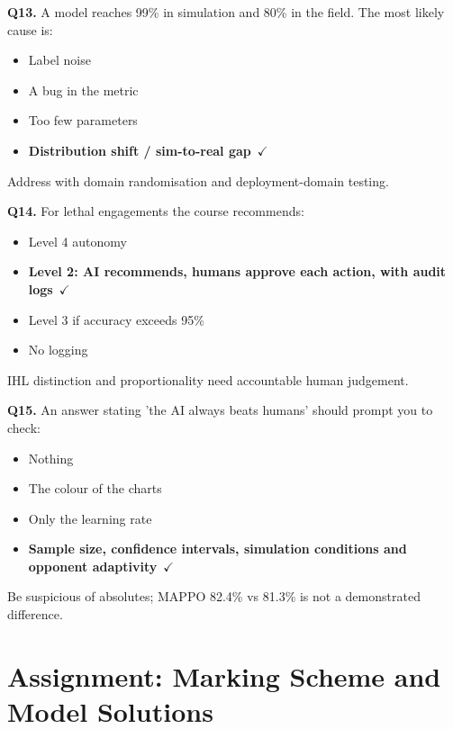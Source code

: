 \documentclass[11pt]{article}
\begin{document}
{\noindent\textbf{Q13.} A model reaches 99\% in simulation and 80\% in the field. The most likely cause is:\begin{itemize}[leftmargin=2.2em,itemsep=0pt,topsep=1pt]\item[A.] Label noise\item[B.] A bug in the metric\item[C.] Too few parameters\item[\textbf{D.}] \textbf{Distribution shift / sim-to-real gap}~{\color{GrnN}$\checkmark$}\end{itemize} Address with domain randomisation and deployment-domain testing.\par\medskip

\noindent\textbf{Q14.} For lethal engagements the course recommends:\begin{itemize}[leftmargin=2.2em,itemsep=0pt,topsep=1pt]\item[A.] Level 4 autonomy\item[\textbf{B.}] \textbf{Level 2: AI recommends, humans approve each action, with audit logs}~{\color{GrnN}$\checkmark$}\item[C.] Level 3 if accuracy exceeds 95\%\item[D.] No logging\end{itemize} IHL distinction and proportionality need accountable human judgement.\par\medskip

\noindent\textbf{Q15.} An answer stating 'the AI always beats humans' should prompt you to check:\begin{itemize}[leftmargin=2.2em,itemsep=0pt,topsep=1pt]\item[A.] Nothing\item[B.] The colour of the charts\item[C.] Only the learning rate\item[\textbf{D.}] \textbf{Sample size, confidence intervals, simulation conditions and opponent adaptivity}~{\color{GrnN}$\checkmark$}\end{itemize} Be suspicious of absolutes; MAPPO 82.4\% vs 81.3\% is not a demonstrated difference.\par\medskip

}

\section{Assignment: Marking Scheme and Model Solutions}
\end{document}
